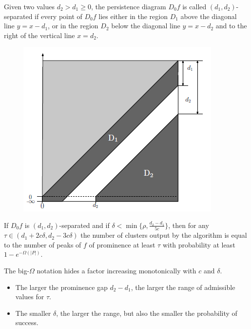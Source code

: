 \documentclass{beamer}
\theoremstyle{definition}
\begin{document}
\begin{frame}
\begin{definition}
Given two values $d_2 > d_1 \geq 0$, the persistence diagram $D_0f$ is called $(d_1, d_2)$-separated if every point of $D_0f$ lies either in the region $D_1$ above the diagonal line $y = x - d_1$, or in the region $D_2$ below the diagonal line $y = x - d_2$ and to the right
of the vertical line $x = d_2$.
\end{definition}
\begin{figure}
\centering
\includegraphics[scale=0.6]{separated}
\end{figure}
\end{frame}

\begin{frame}
\begin{theorem}
If $D_0f$ is $(d_1, d_2)$-separated and if $\delta<\min\{\rho, \frac{d_2-d_1}{5c}\}$, then for any $\tau\in (d_1 + 2c\delta, d_2 - 3c\delta)$ the number of clusters output by the algorithm is equal to the number of peaks of $f$ of prominence at least $\tau$ with probability at least $1 - e^{-\Omega(|P|)}$. %
\end{theorem}\pause
The big-$\Omega$ notation hides a factor increasing monotonically with $c$ and $\delta$.
\begin{itemize}
\item<3-> The larger the prominence gap $d_2- d_1$, the
larger the range of admissible values for $\tau$.
\item<4-> The smaller $\delta$, the larger the range, but also the smaller
the probability of success. %
\end{itemize}

\end{frame}
\end{document}
